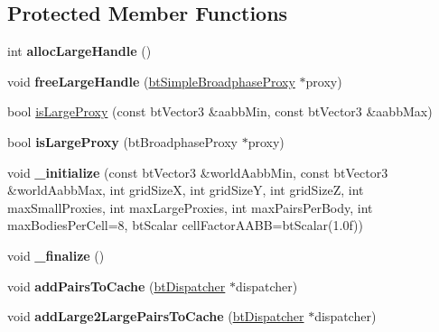 \subsection*{Protected Member Functions}
\begin{DoxyCompactItemize}
\item 
\mbox{\label{classbtGpu3DGridBroadphase_a640c838da14e12aa1244b46bd134ee3a}} 
int {\bfseries alloc\+Large\+Handle} ()
\item 
\mbox{\label{classbtGpu3DGridBroadphase_a886be1bf1f2ebb9c18bd7ec714961794}} 
void {\bfseries free\+Large\+Handle} (\hyperlink{structbtSimpleBroadphaseProxy}{bt\+Simple\+Broadphase\+Proxy} $\ast$proxy)
\item 
bool \hyperlink{classbtGpu3DGridBroadphase_a131cfab867b25116adb72d79435be34d}{is\+Large\+Proxy} (const bt\+Vector3 \&aabb\+Min, const bt\+Vector3 \&aabb\+Max)
\item 
\mbox{\label{classbtGpu3DGridBroadphase_a54623ad8091800695dcb9487da21ff4b}} 
bool {\bfseries is\+Large\+Proxy} (bt\+Broadphase\+Proxy $\ast$proxy)
\item 
\mbox{\label{classbtGpu3DGridBroadphase_a015bbc0dea05a6b9c5256c4cf5b290d0}} 
void {\bfseries \+\_\+initialize} (const bt\+Vector3 \&world\+Aabb\+Min, const bt\+Vector3 \&world\+Aabb\+Max, int grid\+SizeX, int grid\+SizeY, int grid\+SizeZ, int max\+Small\+Proxies, int max\+Large\+Proxies, int max\+Pairs\+Per\+Body, int max\+Bodies\+Per\+Cell=8, bt\+Scalar cell\+Factor\+A\+A\+BB=bt\+Scalar(1.\+0f))
\item 
\mbox{\label{classbtGpu3DGridBroadphase_aa12d32dc4ad28e00961834e81719de19}} 
void {\bfseries \+\_\+finalize} ()
\item 
\mbox{\label{classbtGpu3DGridBroadphase_ad57933c61551ee1fc7f92ce911213228}} 
void {\bfseries add\+Pairs\+To\+Cache} (\hyperlink{classbtDispatcher}{bt\+Dispatcher} $\ast$dispatcher)
\item 
\mbox{\label{classbtGpu3DGridBroadphase_ad0bb78dee2cd822d0fa687ea5aa72a21}} 
void {\bfseries add\+Large2\+Large\+Pairs\+To\+Cache} (\hyperlink{classbtDispatcher}{bt\+Dispatcher} $\ast$dispatcher)

\end{DoxyCompactItemize}

